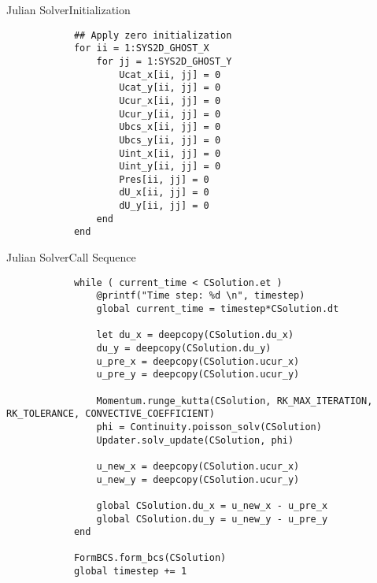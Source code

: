 \documentclass[\string~/GitHub/sthlmNordBeamerTheme/sthlmNordLightDemo.tex]{subfiles}
\begin{document}
\begin{frame}{Julian Solver}{Initialization}

    \begin{center}
        \begin{verbatim}
            ## Apply zero initialization
            for ii = 1:SYS2D_GHOST_X
                for jj = 1:SYS2D_GHOST_Y
                    Ucat_x[ii, jj] = 0
                    Ucat_y[ii, jj] = 0
                    Ucur_x[ii, jj] = 0
                    Ucur_y[ii, jj] = 0
                    Ubcs_x[ii, jj] = 0
                    Ubcs_y[ii, jj] = 0
                    Uint_x[ii, jj] = 0
                    Uint_y[ii, jj] = 0
                    Pres[ii, jj] = 0
                    dU_x[ii, jj] = 0
                    dU_y[ii, jj] = 0
                end
            end         
        \end{verbatim}
    \end{center}
    
\end{frame}

\begin{frame}{Julian Solver}{Call Sequence}

    \begin{center}
        \begin{verbatim}
            while ( current_time < CSolution.et )
                @printf("Time step: %d \n", timestep)
                global current_time = timestep*CSolution.dt
                
                let du_x = deepcopy(CSolution.du_x)
                du_y = deepcopy(CSolution.du_y)
                u_pre_x = deepcopy(CSolution.ucur_x)
                u_pre_y = deepcopy(CSolution.ucur_y)

                Momentum.runge_kutta(CSolution, RK_MAX_ITERATION, RK_TOLERANCE, CONVECTIVE_COEFFICIENT)
                phi = Continuity.poisson_solv(CSolution)
                Updater.solv_update(CSolution, phi)

                u_new_x = deepcopy(CSolution.ucur_x)
                u_new_y = deepcopy(CSolution.ucur_y)

                global CSolution.du_x = u_new_x - u_pre_x
                global CSolution.du_y = u_new_y - u_pre_y
            end

            FormBCS.form_bcs(CSolution)
            global timestep += 1
        \end{verbatim}
    \end{center}
    
\end{frame}
\end{document}

